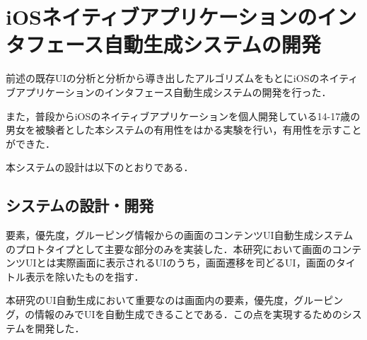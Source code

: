 \chapter{iOSネイティブアプリケーションのインタフェース自動生成システムの開発}
\label{chap:impl}
前述の既存UIの分析と分析から導き出したアルゴリズムをもとにiOSのネイティブアプリケーションのインタフェース自動生成システムの開発を行った．

また，普段からiOSのネイティブアプリケーションを個人開発している14-17歳の男女を被験者とした本システムの有用性をはかる実験を行い，有用性を示すことができた．

本システムの設計は以下のとおりである．
\section{システムの設計・開発}
要素，優先度，グルーピング情報からの画面のコンテンツUI自動生成システムのプロトタイプとして主要な部分のみを実装した．本研究において画面のコンテンツUIとは実際画面に表示されるUIのうち，画面遷移を司どるUI，画面のタイトル表示を除いたものを指す．

本研究のUI自動生成において重要なのは画面内の要素，優先度，グルーピング，の情報のみでUIを自動生成できることである．この点を実現するためのシステムを開発した．

